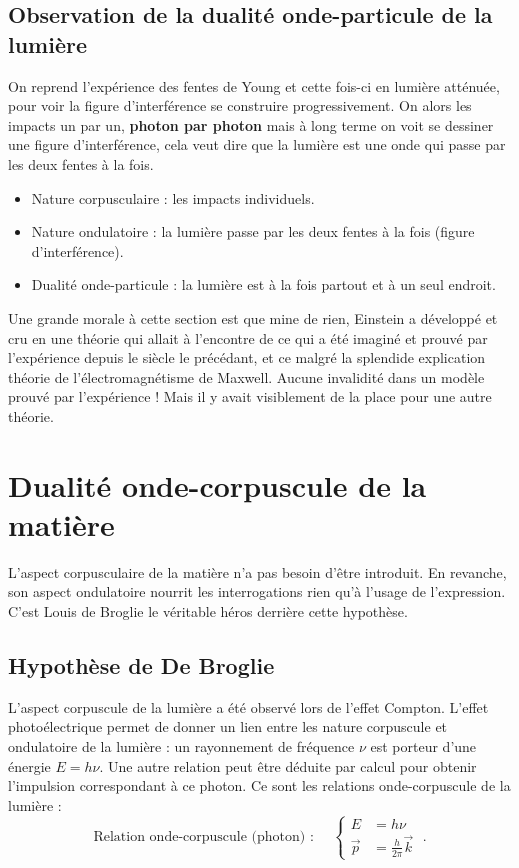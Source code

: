 \documentclass[12pt, a4paper]{book}
\begin{document}
\subsection{Observation de la dualité onde-particule de la lumière}
On reprend l'expérience des fentes de Young et cette fois-ci en lumière atténuée, pour voir la figure d'interférence se construire progressivement. On alors les impacts un par un, \textbf{photon par photon} mais à long terme on voit se dessiner une figure d'interférence, cela veut dire que la lumière est une onde qui passe par les deux fentes à la fois.

\begin{itemize}
\item Nature corpusculaire : les impacts individuels.
\item Nature ondulatoire : la lumière passe par les deux fentes à la fois (figure d'interférence).
\item Dualité onde-particule : la lumière est à la fois partout et à un seul endroit. \end{itemize}

Une grande morale à cette section est que mine de rien, Einstein a développé et cru en une théorie qui allait à l'encontre de ce qui a été imaginé et prouvé par l'expérience depuis le siècle le précédant, et ce malgré la splendide explication théorie de l'électromagnétisme de Maxwell. Aucune invalidité dans un modèle prouvé par l'expérience ! Mais il y avait visiblement de la place pour une autre théorie. 
\section{Dualité onde-corpuscule de la matière}
L'aspect corpusculaire de la matière n'a pas besoin d'être introduit. En revanche, son aspect ondulatoire nourrit les interrogations rien qu'à l'usage de l'expression. C'est Louis de Broglie le véritable héros derrière cette hypothèse.
\subsection{Hypothèse de De Broglie}
L'aspect corpuscule de la lumière a été observé lors de l'effet Compton. L'effet photoélectrique permet de donner un lien entre les nature corpuscule et ondulatoire de la lumière : un rayonnement de fréquence $\nu$ est porteur d'une énergie $E = h\nu$. Une autre relation peut être déduite par calcul pour obtenir l'impulsion correspondant à ce photon. Ce sont les relations onde-corpuscule de la lumière :
\begin{equation}
\boxed{
\text{Relation onde-corpuscule (photon) : } \quad \left\{ \begin{array}{ll}
E &= h\nu \\
\vec p &= \frac{h}{2\pi} \vec k
\end{array} \right. } \; .
\end{equation}
\end{document}
